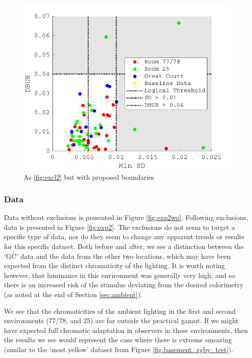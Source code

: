 \begin{figure}[hbtp] 
\includegraphics[max width=\textwidth]{figs/tablet/excl3.pdf} 
\caption{As \ref{fig:excl2} but with proposed boundaries}
\label{fig:excl3}
\end{figure}

\subsubsection{Data}

Data without exclusions is presented in Figure \ref{fig:exp2wo}. Following exclusions, data is presented in Figure \ref{fig:exp2}. The exclusions do not seem to target a specific type of data, nor do they seem to change any apparent trends or results for this specific dataset. Both before and after, we see a distinction between the `GC' data and the data from the other two locations, which may have been expected from the distinct chromaticity of the lighting. It is worth noting however, that luminance in this environment was generally very high, and so there is an increased risk of the stimulus deviating from the desired colorimetry (as noted at the end of Section \ref{sec:ambient}).

We see that the chromaticities of the ambient lighting in the first and second environments (77/78, and 25) are far outside the practical gamut. If we might have expected full chromatic adaptation in observers in these environments, then the results we see would represent the case where there is extreme smearing (similar to the `most yellow' dataset from Figure \ref{fig:basement_rgby_test}). 

